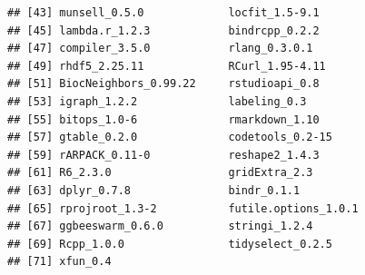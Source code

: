 \documentclass[]{book}
\theoremstyle{definition}
\theoremstyle{definition}
\theoremstyle{definition}
\theoremstyle{remark}
\begin{document}
\begin{verbatim}
## [43] munsell_0.5.0             locfit_1.5-9.1           
## [45] lambda.r_1.2.3            bindrcpp_0.2.2           
## [47] compiler_3.5.0            rlang_0.3.0.1            
## [49] rhdf5_2.25.11             RCurl_1.95-4.11          
## [51] BiocNeighbors_0.99.22     rstudioapi_0.8           
## [53] igraph_1.2.2              labeling_0.3             
## [55] bitops_1.0-6              rmarkdown_1.10           
## [57] gtable_0.2.0              codetools_0.2-15         
## [59] rARPACK_0.11-0            reshape2_1.4.3           
## [61] R6_2.3.0                  gridExtra_2.3            
## [63] dplyr_0.7.8               bindr_0.1.1              
## [65] rprojroot_1.3-2           futile.options_1.0.1     
## [67] ggbeeswarm_0.6.0          stringi_1.2.4            
## [69] Rcpp_1.0.0                tidyselect_0.2.5         
## [71] xfun_0.4
\end{verbatim}


\end{document}
